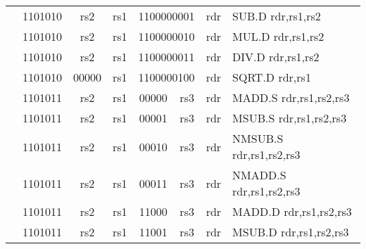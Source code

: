 \begin{table}[p]
\begin{small}
\begin{center}
\begin{tabular}{rcccccccccl}
&
\multicolumn{2}{|c|}{1101010} &
\multicolumn{1}{c|}{rs2} &
\multicolumn{1}{c|}{rs1} &
\multicolumn{4}{c|}{1100000001} &
\multicolumn{1}{c|}{rdr} & SUB.D rdr,rs1,rs2 \\
\cline{2-10}
  

&
\multicolumn{2}{|c|}{1101010} &
\multicolumn{1}{c|}{rs2} &
\multicolumn{1}{c|}{rs1} &
\multicolumn{4}{c|}{1100000010} &
\multicolumn{1}{c|}{rdr} & MUL.D rdr,rs1,rs2 \\
\cline{2-10}
  

&
\multicolumn{2}{|c|}{1101010} &
\multicolumn{1}{c|}{rs2} &
\multicolumn{1}{c|}{rs1} &
\multicolumn{4}{c|}{1100000011} &
\multicolumn{1}{c|}{rdr} & DIV.D rdr,rs1,rs2 \\
\cline{2-10}
  

&
\multicolumn{2}{|c|}{1101010} &
\multicolumn{1}{c|}{00000} &
\multicolumn{1}{c|}{rs1} &
\multicolumn{4}{c|}{1100000100} &
\multicolumn{1}{c|}{rdr} & SQRT.D rdr,rs1 \\
\cline{2-10}
  

&
\multicolumn{2}{|c|}{1101011} &
\multicolumn{1}{c|}{rs2} &
\multicolumn{1}{c|}{rs1} &
\multicolumn{2}{c|}{00000} &
\multicolumn{2}{c|}{rs3} &
\multicolumn{1}{c|}{rdr} & MADD.S rdr,rs1,rs2,rs3 \\
\cline{2-10}
  

&
\multicolumn{2}{|c|}{1101011} &
\multicolumn{1}{c|}{rs2} &
\multicolumn{1}{c|}{rs1} &
\multicolumn{2}{c|}{00001} &
\multicolumn{2}{c|}{rs3} &
\multicolumn{1}{c|}{rdr} & MSUB.S rdr,rs1,rs2,rs3 \\
\cline{2-10}
  

&
\multicolumn{2}{|c|}{1101011} &
\multicolumn{1}{c|}{rs2} &
\multicolumn{1}{c|}{rs1} &
\multicolumn{2}{c|}{00010} &
\multicolumn{2}{c|}{rs3} &
\multicolumn{1}{c|}{rdr} & NMSUB.S rdr,rs1,rs2,rs3 \\
\cline{2-10}
  

&
\multicolumn{2}{|c|}{1101011} &
\multicolumn{1}{c|}{rs2} &
\multicolumn{1}{c|}{rs1} &
\multicolumn{2}{c|}{00011} &
\multicolumn{2}{c|}{rs3} &
\multicolumn{1}{c|}{rdr} & NMADD.S rdr,rs1,rs2,rs3 \\
\cline{2-10}
  

&
\multicolumn{2}{|c|}{1101011} &
\multicolumn{1}{c|}{rs2} &
\multicolumn{1}{c|}{rs1} &
\multicolumn{2}{c|}{11000} &
\multicolumn{2}{c|}{rs3} &
\multicolumn{1}{c|}{rdr} & MADD.D rdr,rs1,rs2,rs3 \\
\cline{2-10}
  

&
\multicolumn{2}{|c|}{1101011} &
\multicolumn{1}{c|}{rs2} &
\multicolumn{1}{c|}{rs1} &
\multicolumn{2}{c|}{11001} &
\multicolumn{2}{c|}{rs3} &
\multicolumn{1}{c|}{rdr} & MSUB.D rdr,rs1,rs2,rs3 \\
\cline{2-10}
  


\end{tabular}
\end{center}
\end{small}
\end{table}
